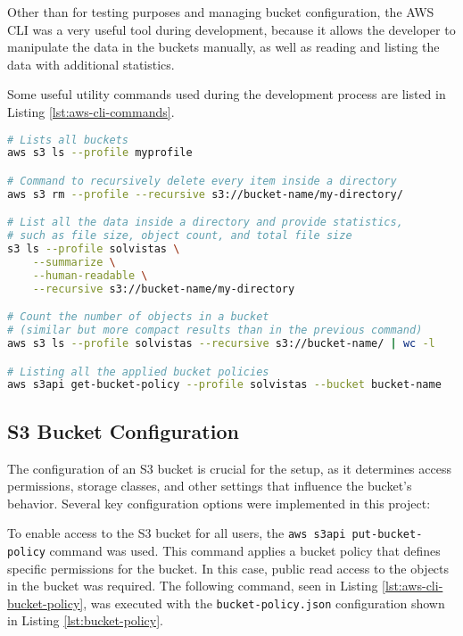 Other than for testing purposes and managing bucket configuration, the AWS CLI was a very useful tool during development, because it allows the developer to manipulate the data in the buckets manually, as well as reading and listing the data with additional statistics.

Some useful utility commands used during the development process are listed in Listing \ref{lst:aws-cli-commands}.

\newpage

\begin{lstlisting}[language=bash, caption={Useful AWS CLI Commands}, label={lst:aws-cli-commands}]
# Lists all buckets
aws s3 ls --profile myprofile

# Command to recursively delete every item inside a directory
aws s3 rm --profile --recursive s3://bucket-name/my-directory/

# List all the data inside a directory and provide statistics,
# such as file size, object count, and total file size
s3 ls --profile solvistas \
    --summarize \
    --human-readable \
    --recursive s3://bucket-name/my-directory

# Count the number of objects in a bucket
# (similar but more compact results than in the previous command)
aws s3 ls --profile solvistas --recursive s3://bucket-name/ | wc -l

# Listing all the applied bucket policies
aws s3api get-bucket-policy --profile solvistas --bucket bucket-name

\end{lstlisting}

\subsection{S3 Bucket Configuration}
The configuration of an S3 bucket is crucial for the setup, as it determines access permissions, storage classes, and other settings that influence the bucket’s behavior. Several key configuration options were implemented in this project:

To enable access to the S3 bucket for all users, the \texttt{aws s3api put-bucket-policy} command was used. This command applies a bucket policy that defines specific permissions for the bucket. In this case, public read access to the objects in the bucket was required. The following command, seen in Listing \ref{lst:aws-cli-bucket-policy}, was executed with the \texttt{bucket-policy.json} configuration shown in Listing \ref{lst:bucket-policy}.

